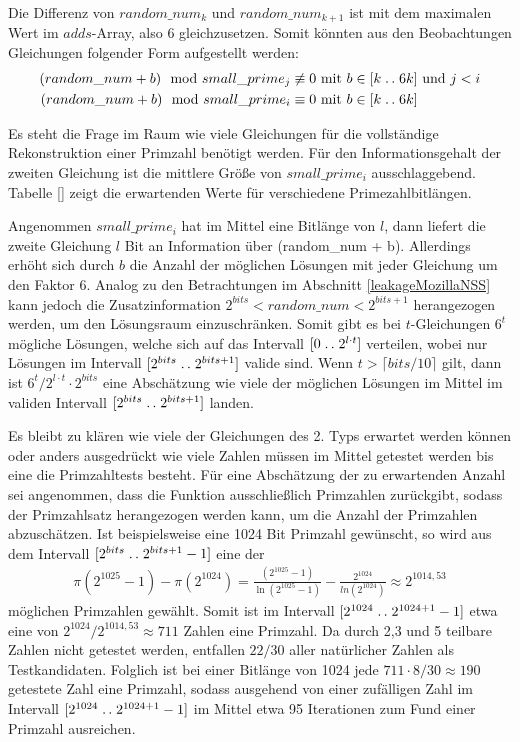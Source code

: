 Die Differenz von $random\_num_k$ und $random\_num_{k+1}$ ist mit dem maximalen Wert im $adds$-Array, also 6 gleichzusetzen.
Somit könnten aus den Beobachtungen Gleichungen folgender Form aufgestellt werden:
\begin{align*}
    (random\_num + b) \mod small\_prime_j \not\equiv 0 &\text{ mit } b \in [k\mathrel{{.}\,{.}}\nobreak6k] \text{ und } j < i\\
    (random\_num + b) \mod small\_prime_i \equiv 0 &\text{ mit } b \in [k\mathrel{{.}\,{.}}\nobreak6k]
\end{align*}

Es steht die Frage im Raum wie viele Gleichungen für die vollständige Rekonstruktion einer Primzahl benötigt werden.
Für den Informationsgehalt der zweiten Gleichung ist die mittlere Größe von $small\_prime_i$ ausschlaggebend.
Tabelle \ref{} zeigt die erwartenden Werte für verschiedene Primezahlbitlängen. 

Angenommen $small\_prime_i$ hat im Mittel eine Bitlänge von $l$, dann liefert die zweite Gleichung $l$ Bit an Information über (random\_num + b).
Allerdings erhöht sich durch $b$ die Anzahl der möglichen Lösungen mit jeder Gleichung um den Faktor 6.
Analog zu den Betrachtungen im Abschnitt \ref{leakageMozillaNSS} kann jedoch die Zusatzinformation $2^{bits} < random\_num < 2^{bits+1}$ herangezogen werden, um den Lösungsraum einzuschränken.
Somit gibt es bei $t$-Gleichungen $6^t$ mögliche Lösungen, welche sich auf das Intervall $[0 \mathrel{{.}\,{.}}\nobreak2^{l\cdot t}]$ verteilen, wobei nur Lösungen im Intervall $[2^{bits} \mathrel{{.}\,{.}}\nobreak 2^{bits+1}]$ valide sind.
Wenn $t > \lceil bits/10 \rceil$ gilt, dann ist $6^t/2^{l \cdot t} \cdot 2^{bits}$ eine Abschätzung wie viele der möglichen Lösungen im Mittel im validen Intervall $[2^{bits} \mathrel{{.}\,{.}}\nobreak 2^{bits+1}]$ landen.

Es bleibt zu klären wie viele der Gleichungen des 2. Typs erwartet werden können oder anders ausgedrückt wie viele Zahlen müssen im Mittel getestet werden bis eine die Primzahltests besteht. 
Für eine Abschätzung der zu erwartenden Anzahl sei angenommen, dass die Funktion ausschließlich Primzahlen zurückgibt, sodass der Primzahlsatz herangezogen werden kann, um die Anzahl der Primzahlen abzuschätzen.
Ist beispielsweise eine 1024 Bit Primzahl gewünscht, so wird aus dem Intervall $[2^{bits}\mathrel{{.}\,{.}}\nobreak 2^{bits+1}-1]$ eine der \begin{align}
\pi(2^{1025}-1) - \pi(2^{1024}) = \frac{(2^{1025}-1)}{\ln(2^{1025}-1)} - \frac{2^{1024}}{ln(2^{1024})} \approx 2^{1014,53}
\end{align}
möglichen Primzahlen gewählt.
Somit ist im Intervall $[2^{1024}\mathrel{{.}\,{.}}\nobreak 2^{1024+1}-1]$ etwa eine von $2^{1024}/2^{1014,53} \approx 711$ Zahlen eine Primzahl.
Da durch 2,3 und 5 teilbare Zahlen nicht getestet werden, entfallen $22/30$ aller natürlicher Zahlen als Testkandidaten.
Folglich ist bei einer Bitlänge von 1024 jede $711 \cdot 8/30 \approx 190$ getestete Zahl eine Primzahl, sodass ausgehend von einer zufälligen Zahl im Intervall $[2^{1024}\mathrel{{.}\,{.}}\nobreak 2^{1024+1}-1]$ im Mittel etwa 95 Iterationen zum Fund einer Primzahl ausreichen.


